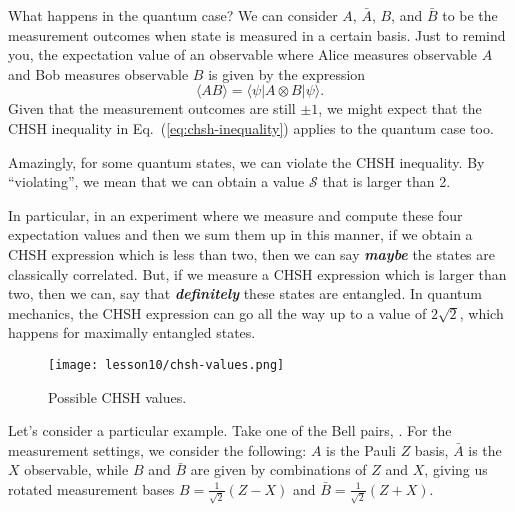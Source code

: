 What happens in the quantum case?
We can consider $A$, $\bar{A}$, $B$, and $\bar{B}$ to be the measurement outcomes when state \ket{\psi} is measured in a certain basis.
Just to remind you, the expectation value of an observable where Alice measures observable $A$ and Bob measures observable $B$ is given by the expression
\begin{equation}
    \langle A B\rangle=\langle\psi|A \otimes B| \psi\rangle.
\end{equation}
Given that the measurement outcomes are still $\pm1$, we might expect that the CHSH inequality in Eq.~(\ref{eq:chsh-inequality}) applies to the quantum case too.

Amazingly, for some quantum states, we can violate the CHSH inequality.
By ``violating'', we mean that we can obtain a value $\mathcal{S}$ that is larger than 2.

In particular, in an experiment where we measure and compute these four expectation values and then we sum them up in this manner, if we obtain a CHSH expression which is less than two,
then we can say \textbf{\emph{maybe}} the states are classically correlated.
But, if we measure a CHSH expression which is larger than two, then we can, say that \textbf{\emph{definitely}} these states are entangled.
In quantum mechanics, the CHSH expression can go all the way up to a value of $2\sqrt{2}$, which happens for maximally entangled states.

\begin{figure}[H]
    \centering
    \texttt{[image: lesson10/chsh-values.png]}
    \caption{Possible CHSH values.}
    \label{fig:chsh-values}
\end{figure}

Let's consider a particular example.
Take one of the Bell pairs, \ket{\Psi^+}.
For the measurement settings, we consider the following: $A$ is the Pauli $Z$ basis, $\bar{A}$ is the $X$ observable, while $B$ and $\bar{B}$ are given by combinations of $Z$ and $X$, giving us rotated measurement bases $B=\frac{1}{\sqrt{2}}(Z-X)$ and $\bar{B}=\frac{1}{\sqrt{2}}(Z+X)$.

